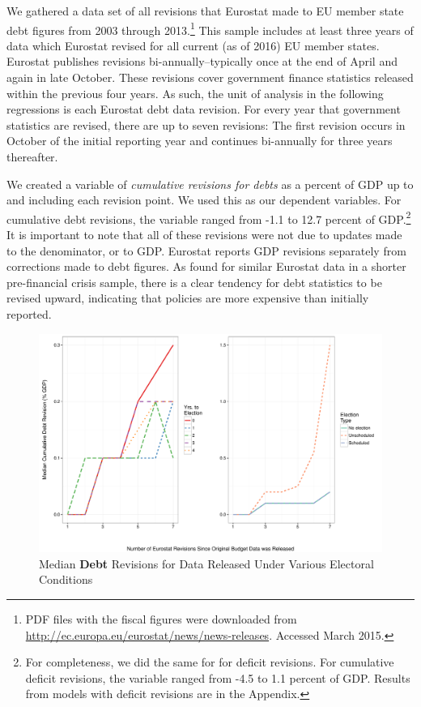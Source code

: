 \documentclass[]{article}
\begin{document}
We gathered a data set of all revisions that Eurostat made to EU member state debt figures from 2003 through 2013.\footnote{PDF files with the fiscal figures were downloaded from \url{http://ec.europa.eu/eurostat/news/news-releases}. Accessed March 2015.} This sample includes at least three years of data which Eurostat revised for all current (as of 2016) EU member states. Eurostat publishes revisions bi-annually--typically once at the end of April and again in late October. These revisions cover government finance statistics released within the previous four years. As such, the unit of analysis in the following regressions is each Eurostat debt data revision. For every year that government statistics are revised, there are up to seven revisions: The first revision occurs in October of the initial reporting year and continues bi-annually for three years thereafter.

We created a variable of \emph{cumulative revisions for debts} as a percent of GDP up to and including each revision point. We used this as our dependent variables. For cumulative debt revisions, the variable ranged from -1.1 to 12.7 percent of GDP.\footnote{For completeness, we did the same for for deficit revisions. For cumulative deficit revisions, the variable ranged from -4.5 to 1.1 percent of GDP. Results from models with deficit revisions are in the Appendix.} It is important to note that all of these revisions were not due to updates made to the denominator, or to GDP. Eurostat reports GDP revisions separately from corrections made to debt figures. As \cite{DeCastro2013} found for similar Eurostat data in a shorter pre-financial crisis sample, there is a clear tendency for debt statistics to be revised upward, indicating that policies are more expensive than initially reported.

\begin{figure}
    \begin{center}
        \caption{Median \textbf{Debt} Revisions for Data Released Under Various Electoral Conditions}
        \label{median_debt_revisions}
        \includegraphics[scale=0.55]{figures/median_debt_revisions.pdf}
    \end{center}
\end{figure}
\end{document}

